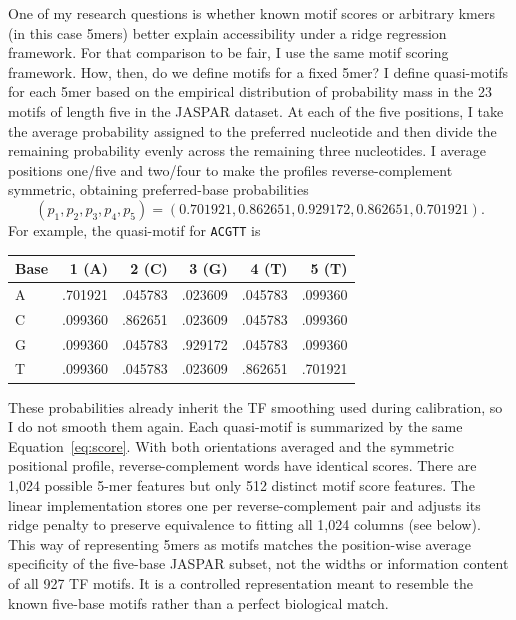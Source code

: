 \documentclass[10pt]{article}
\begin{document}
One of my research questions is whether known motif scores or arbitrary kmers (in this case 5mers) better explain accessibility under a ridge regression framework. For that comparison to be fair, I use the same motif scoring framework. How, then, do we define motifs for a fixed 5mer? I define quasi-motifs for each 5mer based on the empirical distribution of probability mass in the 23 motifs of length five in the JASPAR dataset. At each of the five positions, I take the average probability assigned to the preferred nucleotide and then divide the remaining probability evenly across the remaining three nucleotides. I average positions one/five and two/four to make the profiles reverse-complement symmetric, obtaining preferred-base probabilities
\[
(p_1,p_2,p_3,p_4,p_5)=(0.701921,0.862651,0.929172,0.862651,0.701921).
\]
For example, the quasi-motif for \texttt{ACGTT} is
\begin{center}
\begin{tabular}{lrrrrr}
\toprule
Base & 1 (A) & 2 (C) & 3 (G) & 4 (T) & 5 (T)\\
\midrule
A & .701921 & .045783 & .023609 & .045783 & .099360\\
C & .099360 & .862651 & .023609 & .045783 & .099360\\
G & .099360 & .045783 & .929172 & .045783 & .099360\\
T & .099360 & .045783 & .023609 & .862651 & .701921\\
\bottomrule
\end{tabular}
\end{center}
These probabilities already inherit the TF smoothing used during calibration, so I do not smooth them again. Each quasi-motif is summarized by the same Equation~\ref{eq:score}. With both orientations averaged and the symmetric positional profile, reverse-complement words have identical scores. There are 1,024 possible 5-mer features but only 512 distinct motif score features. The linear implementation stores one per reverse-complement pair and adjusts its ridge penalty to preserve equivalence to fitting all 1,024 columns (see below). This way of representing 5mers as motifs matches the position-wise average specificity of the five-base JASPAR subset, not the widths or information content of all 927 TF motifs. It is a controlled representation meant to resemble the known five-base motifs rather than a perfect biological match.
\end{document}
